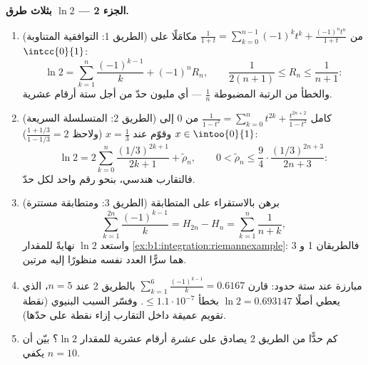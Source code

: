 \begin{problem}
\medskip
\noindent\textbf{الجزء 2 --- $\ln 2$ بثلاث طرق.}
\begin{enumerate}[resume]
  \item (الطريق 1: التوافقية المتناوبة) من $\frac{1}{1+t} =
        \sum_{k=0}^{n-1}(-1)^k t^k + \frac{(-1)^n t^n}{1+t}$
        مكامَلًا على $\intcc{0}{1}$:
        \[
        \ln 2 = \sum_{k=1}^{n} \frac{(-1)^{k-1}}{k} + (-1)^n
        R_n, \qquad \frac{1}{2(n+1)} \leq R_n \leq
        \frac{1}{n+1} :
        \]
        والخطأ من الرتبة المضبوطة $\frac 1n$ --- أي مليون
        حدّ من أجل ستة أرقام عشرية.
  \item (الطريق 2: المتسلسلة السريعة) كامل $\frac{1}{1 - t^2} =
        \sum_{k=0}^{n} t^{2k} + \frac{t^{2n+2}}{1-t^2}$ من $0$
        إلى $x \in \intoo{0}{1}$ وقوّم عند $x = \frac13$
        (ولاحظ $\frac{1 + 1/3}{1 - 1/3} = 2$):
        \[
        \ln 2 = 2\sum_{k=0}^{n} \frac{(1/3)^{2k+1}}{2k+1} +
        \tilde\rho_n,
        \qquad
        0 < \tilde\rho_n \leq \frac{9}{4}\cdot
        \frac{(1/3)^{2n+3}}{2n+3} :
        \]
        فالتقارب هندسي، بنحو رقم واحد لكل حدّ.
  \item (الطريق 3:  ومتطابقة مستترة) برهن
        بالاستقراء على المتطابقة
        \[
        \sum_{k=1}^{2n} \frac{(-1)^{k-1}}{k} = H_{2n} - H_n =
        \sum_{k=1}^{n} \frac{1}{n + k} ,
        \]
        واستعد $\ln 2$ نهايةً  للمقدار
        \cref{ex:b1:integration:riemannexample}: فالطريقان 1 و 3
        هما سرًّا العدد نفسه منظورًا إليه مرتين.
  \item مبارزة عند ستة حدود: قارن $\sum_{k=1}^{6}
        \frac{(-1)^{k-1}}{k} = 0.6167$ بالطريق 2 عند $n = 5$،
        الذي يعطي أصلًا $\ln 2 = 0.693147$ بخطأ $\leq
        1.1\cdot10^{-7}$. وفسّر السبب البنيوي
        (نقطة تقويم عميقة داخل 
        التقارب إزاء نقطة على حدّها).
  \item كم حدًّا من الطريق 2 يصادق على \emph{عشرة} أرقام عشرية للمقدار
        $\ln 2$؟ بيّن أن $n = 10$ يكفي.
\end{enumerate}


\end{problem}
